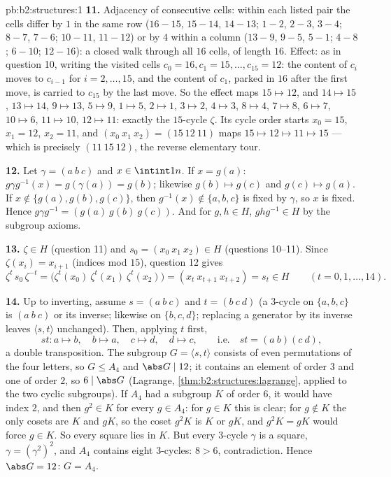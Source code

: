 \begin{solution}{pb:b2:structures:1}
\textbf{11.} Adjacency of consecutive cells: within each listed
pair the cells differ by $1$ in the same row ($16{-}15$,
$15{-}14$, $14{-}13$; $1{-}2$, $2{-}3$, $3{-}4$; $8{-}7$,
$7{-}6$; $10{-}11$, $11{-}12$) or by $4$ within a column
($13{-}9$, $9{-}5$, $5{-}1$; $4{-}8$; $6{-}10$; $12{-}16$): a
closed walk through all $16$ cells, of length $16$. Effect: as
in question 10, writing the visited cells $c_0 = 16, c_1 = 15,
\dots, c_{15} = 12$: the content of $c_i$ moves to $c_{i-1}$ for
$i = 2, \dots, 15$, and the content of $c_1$, parked in $16$
after the first move, is carried to $c_{15}$ by the last move.
So the effect maps $15 \mapsto 12$, and $14 \mapsto 15$, $13
\mapsto 14$, $9 \mapsto 13$, $5 \mapsto 9$, $1 \mapsto 5$, $2
\mapsto 1$, $3 \mapsto 2$, $4 \mapsto 3$, $8 \mapsto 4$, $7
\mapsto 8$, $6 \mapsto 7$, $10 \mapsto 6$, $11 \mapsto 10$, $12
\mapsto 11$: exactly the $15$-cycle $\zeta$. Its cycle order
starts $x_0 = 15$, $x_1 = 12$, $x_2 = 11$, and $(x_0\ x_1\ x_2)
= (15\ 12\ 11)$ maps $15 \mapsto 12 \mapsto 11 \mapsto 15$ ---
which is precisely $(11\ 15\ 12)$, the reverse elementary tour.

\textbf{12.} Let $\gamma = (a\ b\ c)$ and $x \in \intint1n$. If
$x = g(a)$: $g\gamma g^{-1}(x) = g(\gamma(a)) = g(b)$; likewise
$g(b) \mapsto g(c)$ and $g(c) \mapsto g(a)$. If $x \notin
\{g(a), g(b), g(c)\}$, then $g^{-1}(x) \notin \{a,b,c\}$ is
fixed by $\gamma$, so $x$ is fixed. Hence $g\gamma g^{-1} =
(g(a)\ g(b)\ g(c))$. And for $g, h \in H$, $ghg^{-1} \in H$ by
the subgroup axioms.

\textbf{13.} $\zeta \in H$ (question 11) and $s_0 = (x_0\ x_1\
x_2) \in H$ (questions 10--11). Since $\zeta(x_i) = x_{i+1}$
(indices mod $15$), question 12 gives
\[
\zeta^{t}\,s_0\,\zeta^{-t}
= \bigl(\zeta^t(x_0)\ \zeta^t(x_1)\ \zeta^t(x_2)\bigr)
= (x_t\ x_{t+1}\ x_{t+2}) = s_t \in H
\qquad (t = 0, 1, \dots, 14).
\]

\textbf{14.} Up to inverting, assume $s = (a\ b\ c)$ and $t =
(b\ c\ d)$ (a $3$-cycle on $\{a,b,c\}$ is $(a\ b\ c)$ or its
inverse; likewise on $\{b,c,d\}$; replacing a generator by its
inverse leaves $\langle s, t\rangle$ unchanged). Then, applying
$t$ first,
\[
st \colon a \mapsto b,\quad b \mapsto a,\quad c \mapsto d,\quad
d \mapsto c, \qquad\text{i.e.}\quad st = (a\ b)(c\ d),
\]
a double transposition. The subgroup $G = \langle s, t\rangle$
consists of even permutations of the four letters, so $G \leq
A_4$ and $\abs G \mid 12$; it contains an element of order $3$
and one of order $2$, so $6 \mid \abs G$ (Lagrange,
\cref{thm:b2:structures:lagrange}, applied to the two cyclic
subgroups). If $A_4$ had a subgroup $K$ of order $6$, it would
have index $2$, and then $g^2 \in K$ for every $g \in A_4$: for
$g \in K$ this is clear; for $g \notin K$ the only cosets are
$K$ and $gK$, so the coset $g^2K$ is $K$ or $gK$, and $g^2K =
gK$ would force $g \in K$. So every square lies in $K$. But every
$3$-cycle $\gamma$ is a square, $\gamma = (\gamma^2)^2$, and
$A_4$ contains eight $3$-cycles: $8 > 6$, contradiction. Hence
$\abs G = 12$: $G = A_4$.


\end{solution}
